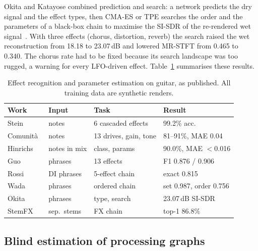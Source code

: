 Okita and Katayose combined prediction and search: a network predicts the dry
signal and the effect types, then CMA-ES or TPE searches the order and the
parameters of a black-box chain to maximise the SI-SDR of the re-rendered wet
signal~\cite{okita2026audio}. With three effects (chorus, distortion,
reverb) the search raised the wet reconstruction from 18.18 to 23.07\,dB and
lowered MR-STFT from 0.465 to 0.340. The chorus rate had to be fixed because
its search landscape was too rugged, a warning for every LFO-driven effect.
Table~\ref{tab:recognition} summarises these results.

\begin{table}[t]
\centering
\caption{Effect recognition and parameter estimation on guitar, as published.
All training data are synthetic renders.}
\label{tab:recognition}
\scriptsize
\setlength{\tabcolsep}{2.5pt}
\begin{tabular}{@{}llll@{}}
\toprule
Work & Input & Task & Result \\
\midrule
Stein~\cite{stein2010dafx} & notes & 6 cascaded effects & 99.2\% acc. \\
Comunità~\cite{comunita2021guitar} & notes & 13 drives, gain, tone & 81--91\%, MAE 0.04 \\
Hinrichs~\cite{hinrichs2022convolutional} & notes in mix & class, params & 90.0\%, MAE $<$0.016 \\
Guo~\cite{guo2023automatic} & phrases & 13 effects & F1 0.876 / 0.906 \\
Rossi~\cite{rossi2025automatic} & DI phrases & 5-effect chain & exact 0.815 \\
Wada~\cite{wada2025hyperbolic} & phrases & ordered chain & set 0.987, order 0.756 \\
Okita~\cite{okita2026audio} & phrases & type, search & 23.07\,dB SI-SDR \\
StemFX~\cite{cheng2026stemfx} & sep.\ stems & FX chain & top-1 86.8\% \\
\bottomrule
\end{tabular}
\end{table}

\subsection{Blind estimation of processing graphs}

